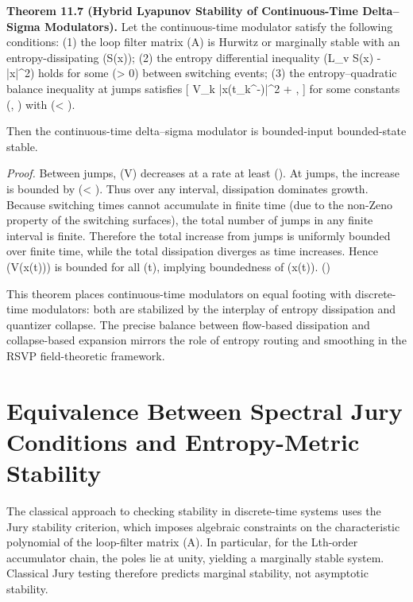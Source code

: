 \medskip

\textbf{Theorem 11.7 (Hybrid Lyapunov Stability of Continuous-Time Delta–Sigma Modulators).}
Let the continuous-time modulator satisfy the following conditions:
(1) the loop filter matrix (A) is Hurwitz or marginally stable with an entropy-dissipating (S(x));
(2) the entropy differential inequality (L_{v} S(x) \le -\gamma |x|^{2}) holds for some (\gamma > 0) between switching events;
(3) the entropy–quadratic balance inequality at jumps satisfies
[
\Delta V_{k} \le \beta |x(t_{k}^{-})|^{2} + \delta,
]
for some constants (\beta, \delta) with (\beta < \gamma).

Then the continuous-time delta–sigma modulator is bounded-input bounded-state stable.

\textit{Proof.}
Between jumps, (V) decreases at a rate at least (\gamma). At jumps, the increase is bounded by (\beta < \gamma). Thus over any interval, dissipation dominates growth. Because switching times cannot accumulate in finite time (due to the non-Zeno property of the switching surfaces), the total number of jumps in any finite interval is finite. Therefore the total increase from jumps is uniformly bounded over finite time, while the total dissipation diverges as time increases. Hence (V(x(t))) is bounded for all (t), implying boundedness of (x(t)). \hfill(\square)

\medskip

This theorem places continuous-time modulators on equal footing with discrete-time modulators: both are stabilized by the interplay of entropy dissipation and quantizer collapse. The precise balance between flow-based dissipation and collapse-based expansion mirrors the role of entropy routing and smoothing in the RSVP field-theoretic framework.

\bigskip

\section*{Equivalence Between Spectral Jury Conditions and Entropy-Metric Stability}

The classical approach to checking stability in discrete-time systems uses the Jury stability criterion, which imposes algebraic constraints on the characteristic polynomial of the loop-filter matrix (A). In particular, for the Lth-order accumulator chain, the poles lie at unity, yielding a marginally stable system. Classical Jury testing therefore predicts marginal stability, not asymptotic stability.

